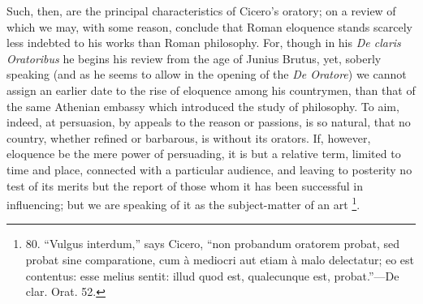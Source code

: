 Such, then, are the principal
characteristics of Cicero's oratory; on a review of which we may,
with some reason, conclude that Roman eloquence stands scarcely less
indebted to his works than Roman philosophy. For, though in his \emph{De
claris Oratoribus} he begins his review from the age of Junius
Brutus, yet, soberly speaking (and as he seems to allow in the opening
of the \emph{De Oratore}) we cannot assign an earlier date to
the rise of eloquence among his countrymen, than that of the same
Athenian embassy which introduced the study of philosophy. To aim,
indeed, at persuasion, by appeals to the reason or passions, is so
natural, that no country, whether refined or barbarous, is without its
orators. If, however, eloquence be the mere power of persuading, it is
but a relative term, limited to time and place, connected with a
particular audience, and leaving to posterity no test of its merits
but the report of those whom it has been successful in influencing;
but we are speaking of it as the subject-matter of an art \footnote{80.
``Vulgus interdum,''
says Cicero, ``non probandum oratorem probat, sed probat sine
comparatione, cum à mediocri aut etiam à malo delectatur; eo est
contentus: esse melius sentit: illud quod est, qualecunque est, probat.''—De
clar. Orat. 52.}.

